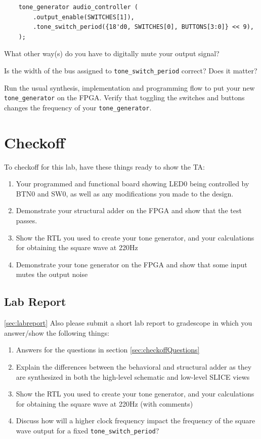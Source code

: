 \documentclass[11pt]{article}
\begin{document}
\begin{verbatim}
    tone_generator audio_controller (
        .output_enable(SWITCHES[1]),
        .tone_switch_period({18'd0, SWITCHES[0], BUTTONS[3:0]} << 9),
    );
\end{verbatim}

What other way(s) do you have to digitally mute your output signal?

Is the width of the bus assigned to \verb|tone_switch_period| correct? Does it matter?

Run the usual synthesis, implementation and programming flow to put your new \verb|tone_generator| on the FPGA. Verify that toggling the switches and buttons changes the frequency of your \verb|tone_generator|.

\section{Checkoff}
To checkoff for this lab, have these things ready to show the TA:

\begin{enumerate}
  \item Your programmed and functional board showing LED0 being controlled by BTN0 and SW0, as well as any modifications you made to the design.
  \item Demonstrate your structural adder on the FPGA and show that the test passes.
  \item Show the RTL you used to create your tone generator, and your calculations for obtaining the square wave at 220Hz
  \item Demonstrate your tone generator on the FPGA and show that some input mutes the output noise
\end{enumerate}

\subsection{Lab Report}\ref{sec:labreport}
Also please submit a short lab report to gradescope in which you answer/show the following things:
\begin{enumerate}
  \item Answers for the questions in section \ref{sec:checkoffQuestions}
  \item Explain the differences between the behavioral and structural adder as they are synthesized in both the high-level schematic and low-level SLICE views
  \item Show the RTL you used to create your tone generator, and your calculations for obtaining the square wave at 220Hz (with comments)
  \item Discuss how will a higher clock frequency impact the frequency of the square wave output for a fixed \verb|tone_switch_period|?
\end{enumerate}
\end{document}
